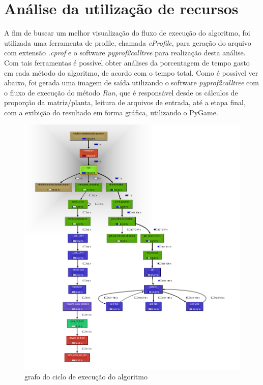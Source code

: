 \documentclass[
	12pt,				%
	openright,			%
	twoside,			%
	a4paper,			%
	english,			%
	french,				%
	spanish,			%
	brazil				%
	]{abntex2}
\begin{document}
\section[Análise da utilização de recursos]{Análise da utilização de recursos}

A fim de buscar um melhor visualização do fluxo de execução do algoritmo, foi utilizada uma ferramenta de profile, chamada \textit{cProfile}, para geração do arquivo com extensão \textit{.cprof} e o software \textit{pyprof2calltree} para realização desta análise. Com tais ferramentas é possível obter análises da porcentagem de tempo gasto em cada método do algoritmo, de acordo com o tempo total. Como é possível ver abaixo, foi gerada uma imagem de saída utilizando o software \textit{pyprof2calltree} com o fluxo de execução do método \textit{Run}, que é responsável desde os cálculos de proporção da matriz/planta, leitura de arquivos de entrada, até a etapa final, com a exibição do resultado em forma gráfica, utilizando o PyGame.

\begin{figure}[ht]
	\caption{\label{cprofile}grafo do ciclo de execução do algoritmo	}
	\begin{center}
		\includegraphics[scale=0.4]{images/graph.jpg}
	\end{center}
\end{figure}
\end{document}
